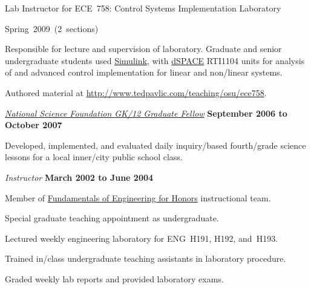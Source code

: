 \documentclass[10pt]{article}
\begin{document}
\begin{outerlist}
\begin{innerlist}
        \item Lab Instructor for ECE~758: Control Systems Implementation
            Laboratory
        \begin{innerlist}
            \item Spring~2009~(2~sections)


            \item Responsible for lecture and supervision of laboratory.
                Graduate and senior undergraduate students used
                \href{http://www.mathworks.com/products/simulink/}{Simulink},
                with \href{http://www.dspaceinc.com/}{dSPACE} RTI1104
                units for analysis of and advanced control implementation
                for linear and non\-/linear systems.

            \item Authored material at
                \url{http://www.tedpavlic.com/teaching/osu/ece758}.
        \end{innerlist}
    \end{innerlist}

\item[] \href{http://www.nsfgk12.org/}
        {\emph{National Science Foundation GK\-/12 Graduate Fellow}}
        \hfill \textbf{September 2006 to October 2007}
\begin{innerlist}
    \item[] Developed, implemented, and evaluated daily inquiry\-/based
        fourth\-/grade science lessons for a local inner\-/city public
        school class.
\end{innerlist}

\item[] \textit{Instructor}%
        \hfill \textbf{March 2002 to June 2004}
\begin{innerlist}
\item Member of \href{http://feh.eng.ohio-state.edu/}
                     {Fundamentals of Engineering for Honors}
      instructional team.
\item Special graduate teaching appointment as undergraduate.
\item Lectured weekly engineering laboratory for ENG~H191,
        H192, and~H193.
\item Trained in\-/class undergraduate teaching assistants in laboratory
        procedure.
\item Graded weekly lab reports and provided laboratory exams.
\end{innerlist}


\end{outerlist}
\end{document}
